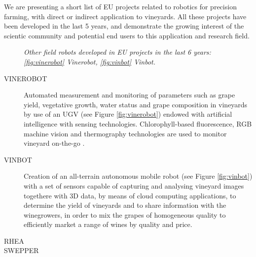 We are presenting a short list of EU projects related to robotics for precision farming, with direct or indirect application to vineyards. All these projects have been developed in the last 5 years, and demonstrate the growing interest of the scientic community and potential end users to this application and research field.

\begin{figure}
	\centering
	\qquad
	\caption{\textit{Other field robots developed in EU projects in the last 6 years: \ref{fig:vinerobot} Vinerobot, \ref{fig:vinbot} Vinbot.}}
\end{figure}

\begin{description}
	\item[VINEROBOT] Automated measurement and monitoring of parameters such as grape yield, vegetative growth, water status and grape composition in vineyards by use of an \ac{UGV} (see Figure \ref{fig:vinerobot}) endowed with artificial intelligence with sensing technologies. Chlorophyll-based fluorescence, RGB machine vision and thermography technologies are used to monitor vineyard on-the-go \parencite{vinerobot}.
	\item[VINBOT] Creation of an all-terrain autonomous mobile robot (see Figure \ref{fig:vinbot}) with a set of sensors capable of capturing and analysing vineyard images togethere with 3D data, by means of cloud computing applications, to determine the yield of vineyards and to share information with the winegrowers, in order to mix the grapes of homogeneous quality to efficiently market a range of wines by quality and price.
	\item[RHEA]
	\item[SWEPPER]
\end{description}


